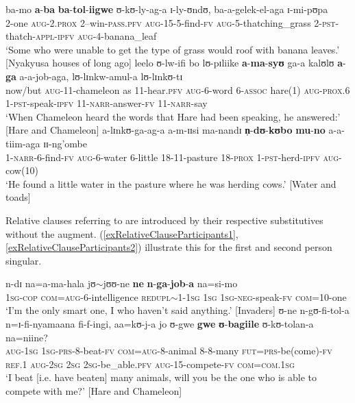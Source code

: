 \begin{exe}
	\ex \label{exSubjectRelativeClause} \gll ba-mo \textbf{a}-\textbf{ba} \textbf{ba}-\textbf{tol}-\textbf{iigwe} ʊ-kʊ-ly-ag-a ɪ-ly-ʊndʊ, ba-a-gelek-el-aga ɪ-mi-pʊpa \\
	2-one \textsc{aug}-2.\textsc{prox} 2--win-\textsc{pass.pfv} \textsc{aug}-15-5-find-\textsc{fv} \textsc{aug}-5-thatching\_grass 2-\textsc{pst}-thatch-\textsc{appl}-\textsc{ipfv} \textsc{aug}-4-banana\_leaf \\
	\glt `Some who were unable to get the type of grass would roof with banana leaves.' [Nyakyusa houses of long ago]
	\ex \label{exObjectRelativeClause}\gll leelo ʊ-lw-ifi bo lʊ-pɪliike \textbf{a}-\textbf{ma}-\textbf{syʊ} ga-a kalʊlʊ \textbf{a}-\textbf{ga} a-a-job-aga, lʊ-lɪnkw-amul-a lʊ-lɪnkʊ-tɪ\\
	now/but \textsc{aug}-11-chameleon as 11-hear.\textsc{pfv} \textsc{aug}-6-word 6-\textsc{assoc} hare(1) \textsc{aug}-\textsc{prox.6} 1-\textsc{pst}-speak-\textsc{ipfv} 11-\textsc{narr}-answer-\textsc{fv} 11-\textsc{narr}-say\\
	\glt `When Chameleon heard the words that Hare had been speaking, he answered:' [Hare and Chameleon]
	\ex \label{exLocativeRelativeClause} \gll a-lɪnkʊ-ga-ag-a a-m-ɪɪsi ma-nandɪ \textbf{n̩}-\textbf{dʊ}-\textbf{kʊbo} \textbf{mu}-\textbf{no} a-a-tiim-aga ɪɪ-ng'ombe\\
	1-\textsc{narr}-6-find-\textsc{fv} \textsc{aug}-6-water 6-little 18-11-pasture 18-\textsc{prox} 1-\textsc{pst}-herd-\textsc{ipfv} \textsc{aug}-cow(10)\\
	\glt `He found a little water in the pasture where he was herding cows.' [Water and toads] 
\end{exe}

Relative clauses referring to  are introduced by their respective substitutives without the augment. (\ref{exRelativeClauseParticipants1}, \ref{exRelativeClauseParticipants2}) illustrate this for the first and second person singular.
\begin{exe}
	\ex \label{exRelativeClauseParticipants1}
	\gll n-dɪ na=a-ma-hala jʊ$\sim$jʊʊ-ne \textbf{ne} \textbf{n}-\textbf{ga}-\textbf{job}-\textbf{a} na=si-mo\\
	\textsc{1sg}-\textsc{cop} \textsc{com}=\textsc{aug}-6-intelligence \textsc{redupl}$\sim$1-\textsc{1sg} \textsc{1sg} \textsc{1sg}-\textsc{neg}-speak-\textsc{fv} \textsc{com}=10-one\\
	\glt \lq I'm the only smart one, I who haven't said anything.' [Invaders]
	\ex\label{exRelativeClauseParticipants2}\gll ʊ-ne n-gʊ-fi-tol-a n=ɪ-fi-nyamaana fi-f-ingi, aa=kʊ-j-a jo ʊ-gwe \textbf{gwe} \textbf{ʊ}-\textbf{bagiile} ʊ-kʊ-tolan-a na=niine?\\
	\textsc{aug}-\textsc{1sg} \textsc{1sg}-\textsc{prs}-8-beat-\textsc{fv} \textsc{com}=\textsc{aug}-8-animal 8-8-many \textsc{fut}=\textsc{prs}-be(come)-\textsc{fv} \textsc{ref.1} \textsc{aug}-\textsc{2sg} \textsc{2sg} \textsc{2sg}-be\_able.\textsc{pfv} \textsc{aug}-15-compete-\textsc{fv} \textsc{com}=\textsc{com.1sg}\\
	\glt `I beat [i.e. have beaten] many animals, will you be the one who is able to compete with me?' [Hare and Chameleon]
\end{exe}

